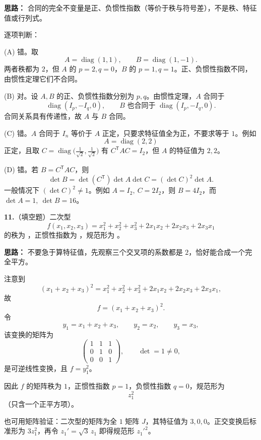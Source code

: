 \textbf{思路：} 合同的完全不变量是正、负惯性指数（等价于秩与符号差），不是秩、特征值或行列式。

逐项判断：

(A) 错。取
\[
A=\operatorname{diag}(1,1),\qquad B=\operatorname{diag}(1,-1).
\]
两者秩都为 \(2\)，但 \(A\) 的 \(p=2,q=0\)，\(B\) 的 \(p=1,q=1\)。正、负惯性指数不同，由惯性定理它们不合同。

(B) 对。设 \(A,B\) 的正、负惯性指数分别为 \(p,q\)。由惯性定理，\(A\) 合同于
\[
\operatorname{diag}(I_p,-I_q,0),\qquad
B\text{ 也合同于 }\operatorname{diag}(I_p,-I_q,0).
\]
合同关系具有传递性，故 \(A\) 与 \(B\) 合同。

(C) 错。\(A\) 合同于 \(I_n\) 等价于 \(A\) 正定，只要求特征值全为正，不要求等于 \(1\)。例如
\[
A=\operatorname{diag}(2,2)
\]
正定，且取 \(C=\operatorname{diag}\bigl(\frac1{\sqrt2},\frac1{\sqrt2}\bigr)\) 有 \(C^{\mathsf T}AC=I_2\)，但 \(A\) 的特征值为 \(2,2\)。

(D) 错。若 \(B=C^{\mathsf T}AC\)，则
\[
\det B=\det(C^{\mathsf T})\det A\det C=(\det C)^2\det A.
\]
一般情况下 \((\det C)^2\neq1\)。例如 \(A=I_2,\ C=2I_2\)，则 \(B=4I_2\)，而 \(\det A=1,\ \det B=16\)。

\else \answerarea[8] \fi%

\textbf{11.}（填空题）二次型
\[
f(x_1,x_2,x_3)=x_1^2+x_2^2+x_3^2+2x_1x_2+2x_2x_3+2x_3x_1
\]
的秩为 \underline{\qquad}，正惯性指数为 \underline{\qquad}，规范形为 \underline{\qquad}。

\ifshowsolutions%

\textbf{思路：} 不要急于算特征值，先观察三个交叉项的系数都是 \(2\)，恰好能合成一个完全平方。

注意到
\[
(x_1+x_2+x_3)^2
=x_1^2+x_2^2+x_3^2+2x_1x_2+2x_2x_3+2x_3x_1,
\]
故
\[
f=(x_1+x_2+x_3)^2.
\]
令
\[
y_1=x_1+x_2+x_3,\qquad y_2=x_2,\qquad y_3=x_3,
\]
该变换的矩阵为
\[
\begin{pmatrix}1&1&1\\0&1&0\\0&0&1\end{pmatrix},
\qquad \det=1\neq0,
\]
是可逆线性变换，且 \(f=y_1^2\)。

因此 \(f\) 的矩阵秩为 \(1\)，正惯性指数 \(p=1\)，负惯性指数 \(q=0\)，规范形为
\[
z_1^2
\]
（只含一个正平方项）。

也可用矩阵验证：二次型的矩阵为全 \(1\) 矩阵 \(J\)，其特征值为 \(3,0,0\)。正交变换后标准形为 \(3z_1^2\)，再令 \(z_1'=\sqrt3\,z_1\) 即得规范形 \(z_1'^2\)。

\else \answerarea[6] \fi%

